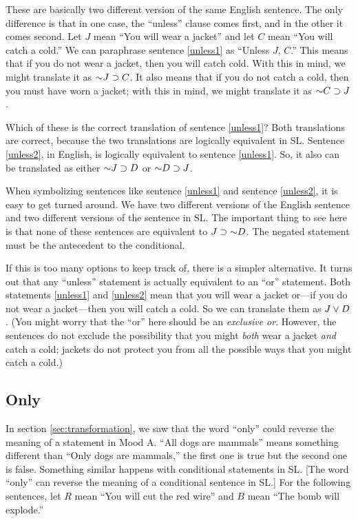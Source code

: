 These are basically two different version of the same English sentence. The only difference is that in one case, the ``unless'' clause comes first, and in the other it comes second. Let $J$ mean ``You will wear a jacket'' and let $C$ mean ``You will catch a cold.'' We can paraphrase sentence \ref{unless1} as ``Unless $J$, $C$.'' This means that if you do not wear a jacket, then you will catch cold. With this in mind, we might translate it as $\mathord{\sim} J \supset C$. It also means that if you do not catch a cold, then you must have worn a jacket; with this in mind, we might translate it as $\mathord{\sim} C \supset J$.

Which of these is the correct translation of sentence \ref{unless1}? Both translations are correct, because the two translations are logically equivalent in SL. Sentence \ref{unless2}, in English, is logically equivalent to sentence \ref{unless1}. So, it also can be translated as either $\mathord{\sim} J \supset D$ or $\mathord{\sim} D \supset J$.

When symbolizing sentences like sentence \ref{unless1} and sentence \ref{unless2}, it is easy to get turned around. We have two different versions of the English sentence and two different versions of the sentence in SL. The important thing to see here is that none of these sentences are equivalent to $J \supset \mathord{\sim} D$. The negated statement must be the antecedent to the conditional. 

If this is too many options to keep track of, there is a simpler alternative. It turns out that any ``unless'' statement is actually equivalent to an ``or'' statement. Both statements \ref{unless1} and  \ref{unless2} mean that you will wear a jacket or---if you do not wear a jacket---then you will catch a cold. So we can translate them as $J \vee D$. (You might worry that the ``or'' here should be an \emph{exclusive or}. However, the sentences do not exclude the possibility that you might \emph{both} wear a jacket \emph{and} catch a cold; jackets do not protect you from all the possible ways that you might catch a cold.)



\subsection{Only}

{In section \ref{sec:transformation}, we saw that the word ``only'' could reverse the meaning of a statement in Mood A. ``All dogs are mammals'' means something different than ``Only dogs are mammals,'' the first one is true but the second one is false. Something similar happens with conditional statements in SL.}%
{[The word ``only'' can reverse the meaning of a conditional sentence in SL.]}%
For the following sentences, let $R$ mean ``You will cut the red wire'' and $B$ mean ``The bomb will explode.''


